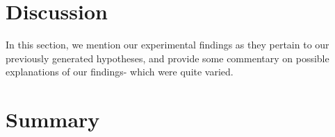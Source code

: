 \documentclass[twoside,11pt]{article}
\begin{document}
\section{Discussion}

In this section, we mention our experimental findings as they pertain to our previously generated hypotheses,
and provide some commentary on possible explanations of our findings- which were quite varied.


\section{Summary}
\end{document}

